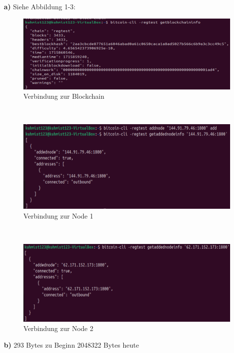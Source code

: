 \documentclass[german]{../uebung}
\begin{document}
\begin{exercise}{1}

    \textbf{a)}
    Siehe Abbildung 1-3:
    \begin{figure}[h]
        \centering
        \includegraphics*[scale=.5]{VerbindungZurBlockchain.png}
        \caption{Verbindung zur Blockchain}
    \end{figure}\\
    \begin{figure}[h]
        \centering
        \includegraphics*[scale=.5]{VerbindungErfolgreich.png}
        \caption{Verbindung zur Node 1}
    \end{figure}\\
    \begin{figure}[h]
        \centering
        \includegraphics*[scale=.5]{Verbindung2.png}
        \caption{Verbindung zur Node 2}
    \end{figure}

    \textbf{b)}
    293 Bytes zu Beginn
    2048322 Bytes heute



\end{exercise}
\end{document}

